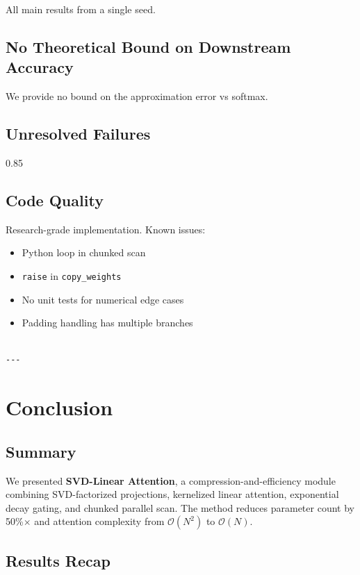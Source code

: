 All main results from a single seed.

\subsection{No Theoretical Bound on Downstream Accuracy}

We provide no bound on the approximation error vs softmax.

\subsection{Unresolved Failures}

0.85

\subsection{Code Quality}

Research-grade implementation. Known issues:
\begin{itemize}
\item Python loop in chunked scan
\item \texttt{raise} in \texttt{copy\_weights}
\item No unit tests for numerical edge cases
\item Padding handling has multiple branches
\end{itemize}
\begin{lstlisting}

---
\end{lstlisting}


\section{Conclusion}

\subsection{Summary}

We presented \textbf{SVD-Linear Attention}, a compression-and-efficiency module 
combining SVD-factorized projections, kernelized linear attention, exponential 
decay gating, and chunked parallel scan. The method reduces parameter count 
by 50\%$\times$ and attention complexity from $\mathcal{O}(N^2)$ to 
$\mathcal{O}(N)$.

\subsection{Results Recap}

